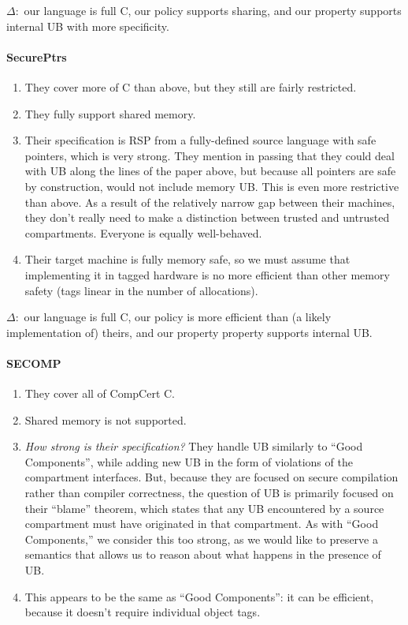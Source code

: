 \documentclass{article}
\begin{document}
\(\Delta:\) our language is full C, our policy supports sharing, and our property supports
internal UB with more specificity.

\paragraph{SecurePtrs}

\begin{enumerate}
\item They cover more of C than above, but they still are fairly restricted.
\item They fully support shared memory.
\item Their specification is RSP from a fully-defined source language with safe pointers,
  which is very strong. They mention in passing that they could deal with UB along the lines
  of the paper above, but because all pointers are safe by construction, would not include
  memory UB. This is even more restrictive than above. As a result of the relatively
  narrow gap between their machines, they don't really need to make a distinction
  between trusted and untrusted compartments. Everyone is equally well-behaved.
\item Their target machine is fully memory safe, so we must assume that implementing it in
  tagged hardware is no more efficient than other memory safety (tags linear in the number
  of allocations).
\end{enumerate}

\(\Delta:\) our language is full C, our policy is more efficient than (a likely implementation of)
theirs, and our property property supports internal UB.

\paragraph{SECOMP}

\begin{enumerate}
\item They cover all of CompCert C.
\item Shared memory is not supported.
\item {\em How strong is their specification?}
  They handle UB similarly to ``Good Components'', while adding new UB in the form of
  violations of the compartment interfaces. But, because they are focused on secure compilation
  rather than compiler correctness, the question of UB is primarily focused on their ``blame''
  theorem, which states that any UB encountered by a source compartment must have originated
  in that compartment. As with ``Good Components,'' we consider this too strong, as we would
  like to preserve a semantics that allows us to reason about what happens in the presence of UB.
\item This appears to be the same as ``Good Components'': it can be efficient, because it doesn't
  require individual object tags.
\end{enumerate}
\end{document}
